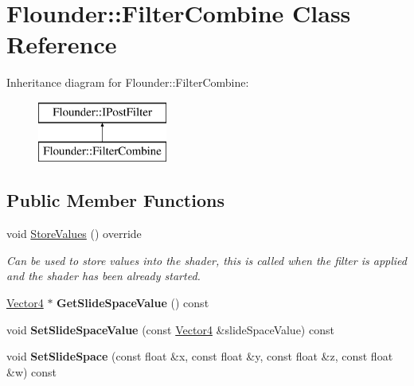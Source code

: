 \hypertarget{class_flounder_1_1_filter_combine}{}\section{Flounder\+:\+:Filter\+Combine Class Reference}
\label{class_flounder_1_1_filter_combine}
Inheritance diagram for Flounder\+:\+:Filter\+Combine\+:\begin{figure}[H]
\begin{center}
\leavevmode
\includegraphics[height=2.000000cm]{class_flounder_1_1_filter_combine}
\end{center}
\end{figure}
\subsection*{Public Member Functions}
\begin{DoxyCompactItemize}
\item 
void \hyperlink{class_flounder_1_1_filter_combine_af35e32eed5f1f9146e2189e6ca6c33c9}{Store\+Values} () override
\begin{DoxyCompactList}\small\item\em Can be used to store values into the shader, this is called when the filter is applied and the shader has been already started. \end{DoxyCompactList}\item 
\mbox{\label{class_flounder_1_1_filter_combine_af018b327492764f691c2ac8adc2cc447}} 
\hyperlink{class_flounder_1_1_vector4}{Vector4} $\ast$ {\bfseries Get\+Slide\+Space\+Value} () const
\item 
\mbox{\label{class_flounder_1_1_filter_combine_af751d8ec47f5f3b86f08adff9a1a6e4a}} 
void {\bfseries Set\+Slide\+Space\+Value} (const \hyperlink{class_flounder_1_1_vector4}{Vector4} \&slide\+Space\+Value) const
\item 
\mbox{\label{class_flounder_1_1_filter_combine_ae6e96a05ec7b31dc3a0c3838f44963fe}} 
void {\bfseries Set\+Slide\+Space} (const float \&x, const float \&y, const float \&z, const float \&w) const
\end{DoxyCompactItemize}
